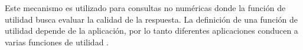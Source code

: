 Este mecanismo es utilizado para consultas no numéricas donde la función de utilidad busca evaluar la calidad de la respuesta. La definición de una función de utilidad depende de la aplicación, por lo tanto diferentes aplicaciones conducen a varias funciones de utilidad \cite{zhu2017differentially}.


%

